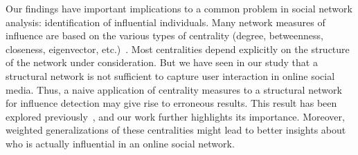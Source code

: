 \documentclass[letterpaper]{article}
\begin{document}



Our findings have important implications to a common problem in social network analysis: identification of influential individuals. Many network measures of influence are based on the various types of centrality (degree, betweenness, closeness, eigenvector, etc.)~\cite{newman2009networks}. Most centralities depend explicitly on the structure of the network under consideration. But we have seen in our study that a structural network is not sufficient to capture user interaction in online social media. Thus, a naive application of centrality measures to a structural network for influence detection may give rise to erroneous results. This result has been explored previously~\cite{kitsak2010identification}, and our work further highlights its importance. Moreover, weighted generalizations of these centralities might lead to better insights about who is actually influential in an online social network.

\end{document}
